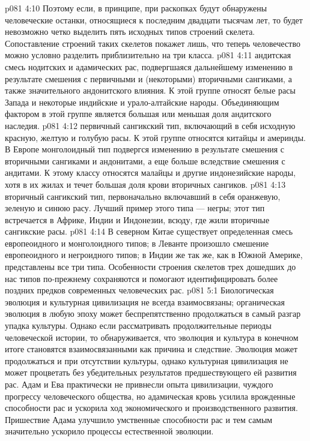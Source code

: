 \vs p081 4:10 Поэтому если, в принципе, при раскопках будут обнаружены человеческие останки, относящиеся к последним двадцати тысячам лет, то будет невозможно четко выделить пять исходных типов строений скелета. Сопоставление строений таких скелетов покажет лишь, что теперь человечество можно условно разделить приблизительно на три класса.
\vs p081 4:11 \bibnobreakspace {} андитская смесь нодитских и адамических рас, подвергшаяся дальнейшему изменению в результате смешения с первичными и (некоторыми) вторичными сангиками, а также значительного андонитского влияния. К этой группе относят белые расы Запада и некоторые индийские и урало\hyp{}алтайские народы. Объединяющим фактором в этой группе является большая или меньшая доля андитского наследия.
\vs p081 4:12 \pc {}\bibnobreakspace {} первичный сангикский тип, включающий в себя исходную красную, желтую и голубую расы. К этой группе относятся китайцы и америнды. В Европе монголоидный тип подвергся изменению в результате смешения с вторичными сангиками и андонитами, а еще больше вследствие смешения с андитами. К этому классу относятся малайцы и другие индонезийские народы, хотя в их жилах и течет большая доля крови вторичных сангиков.
\vs p081 4:13 \pc {}\bibnobreakspace {} вторичный сангикский тип, первоначально включавший в себя оранжевую, зеленую и синюю расу. Лучший пример этого типа --- негры; этот тип встречается в Африке, Индии и Индонезии, всюду, где жили вторичные сангикские расы.
\vs p081 4:14 \pc В северном Китае существует определенная смесь европеоидного и монголоидного типов; в Леванте произошло смешение европеоидного и негроидного типов; в Индии же так же, как в Южной Америке, представлены все три типа. Особенности строения скелетов трех дошедших до нас типов по\hyp{}прежнему сохраняются и помогают идентифицировать более поздних предков современных человеческих рас.
\vs p081 5:1 Биологическая эволюция и культурная цивилизация не всегда взаимосвязаны; органическая эволюция в любую эпоху может беспрепятственно продолжаться в самый разгар упадка культуры. Однако если рассматривать продолжительные периоды человеческой истории, то обнаруживается, что эволюция и культура в конечном итоге становятся взаимосвязанными как причина и следствие. Эволюция может продолжаться и при отсутствии культуры, однако культурная цивилизация не может процветать без убедительных результатов предшествующего ей развития рас. Адам и Ева практически не привнесли опыта цивилизации, чуждого прогрессу человеческого общества, но адамическая кровь усилила врожденные способности рас и ускорила ход экономического и производственного развития. Пришествие Адама улучшило умственные способности рас и тем самым значительно ускорило процессы естественной эволюции.
